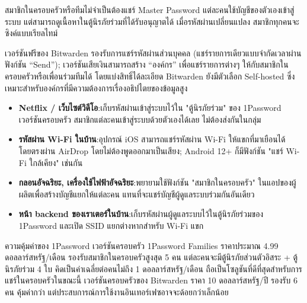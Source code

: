 สมาชิกในครอบครัวหรือทีมไม่จำเป็นต้องแชร์ Master Password แต่ละคนใช้บัญชีของตัวเองเข้าสู่ระบบ แต่สามารถดูเนื้อหาในตู้นิรภัยร่วมที่ได้รับอนุญาตได้ เมื่อรหัสผ่านเปลี่ยนแปลง สมาชิกทุกคนจะซิงค์แบบเรียลไทม์


เวอร์ชันฟรีของ Bitwarden รองรับการแชร์รหัสผ่านส่วนบุคคล (แชร์รายการเดียวแบบจำกัดเวลาผ่านฟังก์ชัน “Send”); เวอร์ชันเสียเงินสามารถสร้าง “องค์กร” เพื่อแชร์รายการต่างๆ ให้กับสมาชิกในครอบครัวหรือเพื่อนร่วมทีมได้ โดยแบ่งสิทธิ์ได้ละเอียด Bitwarden ยังมีตัวเลือก Self-hosted ซึ่งเหมาะสำหรับองค์กรที่มีความต้องการเรื่องอธิปไตยของข้อมูลสูง


\begin{itemize}
  \item \textbf{Netflix / เว็บไซต์วิดีโอ}:เก็บรหัสผ่านเข้าสู่ระบบไว้ใน "ตู้นิรภัยร่วม" ของ 1Password เวอร์ชันครอบครัว สมาชิกแต่ละคนเข้าสู่ระบบด้วยตัวเองได้เลย ไม่ต้องส่งกันในกลุ่ม
  \item \textbf{รหัสผ่าน Wi-Fi ในบ้าน}:อุปกรณ์ iOS สามารถแชร์รหัสผ่าน Wi-Fi ให้แขกที่มาเยือนได้โดยตรงผ่าน AirDrop โดยไม่ต้องพูดออกมาเป็นเสียง; Android 12+ ก็มีฟังก์ชัน "แชร์ Wi-Fi ใกล้เคียง" เช่นกัน
  \item \textbf{กลอนอัจฉริยะ, เครื่องใช้ไฟฟ้าอัจฉริยะ}:พยายามใช้ฟังก์ชัน "สมาชิกในครอบครัว" ในแอปของผู้ผลิตเพื่อสร้างบัญชีแยกให้แต่ละคน แทนที่จะแชร์บัญชีผู้ดูแลระบบร่วมกันอันเดียว
  \item \textbf{หน้า backend ของเราเตอร์ในบ้าน}:เก็บรหัสผ่านผู้ดูแลระบบไว้ในตู้นิรภัยร่วมของ 1Password และเปิด SSID แยกต่างหากสำหรับ Wi-Fi แขก
\end{itemize}

\begin{tcbinfo}{ความคุ้มค่าของ 1Password เวอร์ชันครอบครัว}
1Password Families ราคาประมาณ 4.99 ดอลลาร์สหรัฐ/เดือน รองรับสมาชิกในครอบครัวสูงสุด 5 คน แต่ละคนจะมีตู้นิรภัยส่วนตัวอิสระ + ตู้นิรภัยร่วม 4 ใบ คิดเป็นค่าเฉลี่ยต่อคนไม่ถึง 1 ดอลลาร์สหรัฐ/เดือน ถือเป็นโซลูชันที่ดีที่สุดสำหรับการแชร์ในครอบครัวในขณะนี้ เวอร์ชันครอบครัวของ Bitwarden ราคา 10 ดอลลาร์สหรัฐ/ปี รองรับ 6 คน คุ้มค่ากว่า แต่ประสบการณ์การใช้งานอินเทอร์เฟซอาจจะด้อยกว่าเล็กน้อย

\end{tcbinfo}


